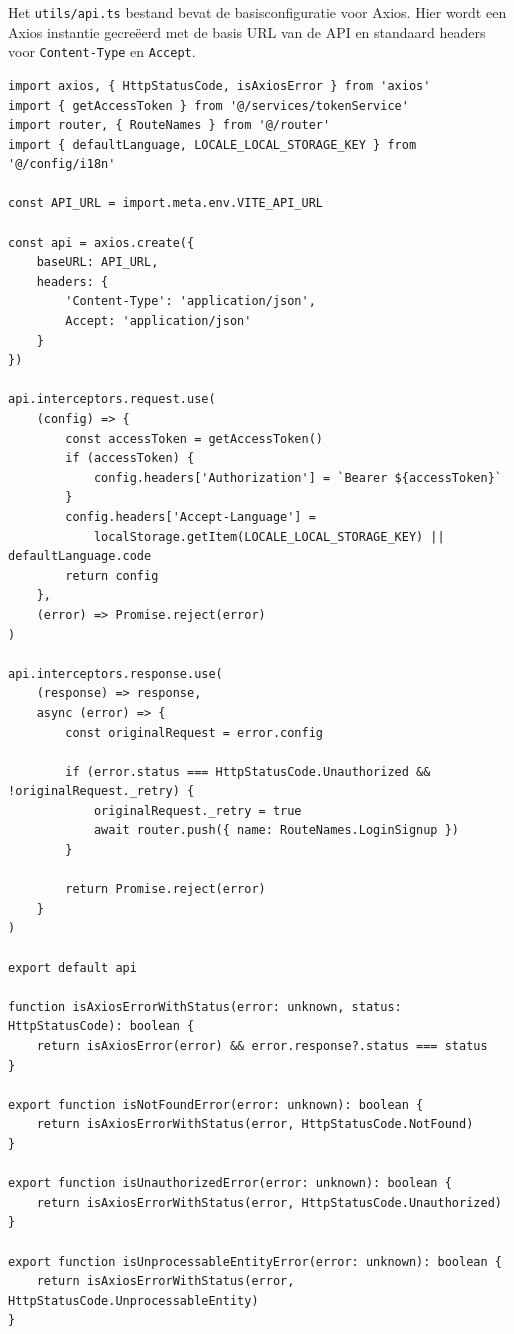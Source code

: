 Het \texttt{utils/api.ts} bestand bevat de basisconfiguratie voor Axios. Hier wordt een Axios instantie gecreëerd met de basis URL van de API en standaard headers voor \texttt{Content-Type} en \texttt{Accept}.

\begin{verbatim}
import axios, { HttpStatusCode, isAxiosError } from 'axios'
import { getAccessToken } from '@/services/tokenService'
import router, { RouteNames } from '@/router'
import { defaultLanguage, LOCALE_LOCAL_STORAGE_KEY } from '@/config/i18n'

const API_URL = import.meta.env.VITE_API_URL

const api = axios.create({
    baseURL: API_URL,
    headers: {
        'Content-Type': 'application/json',
        Accept: 'application/json'
    }
})

api.interceptors.request.use(
    (config) => {
        const accessToken = getAccessToken()
        if (accessToken) {
            config.headers['Authorization'] = `Bearer ${accessToken}`
        }
        config.headers['Accept-Language'] =
            localStorage.getItem(LOCALE_LOCAL_STORAGE_KEY) || defaultLanguage.code
        return config
    },
    (error) => Promise.reject(error)
)

api.interceptors.response.use(
    (response) => response,
    async (error) => {
        const originalRequest = error.config

        if (error.status === HttpStatusCode.Unauthorized && !originalRequest._retry) {
            originalRequest._retry = true
            await router.push({ name: RouteNames.LoginSignup })
        }

        return Promise.reject(error)
    }
)

export default api

function isAxiosErrorWithStatus(error: unknown, status: HttpStatusCode): boolean {
    return isAxiosError(error) && error.response?.status === status
}

export function isNotFoundError(error: unknown): boolean {
    return isAxiosErrorWithStatus(error, HttpStatusCode.NotFound)
}

export function isUnauthorizedError(error: unknown): boolean {
    return isAxiosErrorWithStatus(error, HttpStatusCode.Unauthorized)
}

export function isUnprocessableEntityError(error: unknown): boolean {
    return isAxiosErrorWithStatus(error, HttpStatusCode.UnprocessableEntity)
}
\end{verbatim}
\label{lst:axios_config}

